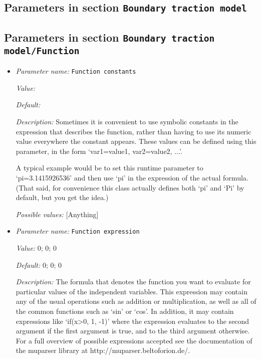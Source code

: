 \subsection{Parameters in section \tt Boundary traction model}
\label{parameters:Boundary_20traction_20model}


\subsection{Parameters in section \tt Boundary traction model/Function}
\label{parameters:Boundary_20traction_20model/Function}

\begin{itemize}
\item {\it Parameter name:} {\tt Function constants}
\label{parameters:Boundary traction model/Function/Function constants}


{\it Value:} 


{\it Default:} 


{\it Description:} Sometimes it is convenient to use symbolic constants in the expression that describes the function, rather than having to use its numeric value everywhere the constant appears. These values can be defined using this parameter, in the form `var1=value1, var2=value2, ...'.

A typical example would be to set this runtime parameter to `pi=3.1415926536' and then use `pi' in the expression of the actual formula. (That said, for convenience this class actually defines both `pi' and `Pi' by default, but you get the idea.)


{\it Possible values:} [Anything]
\item {\it Parameter name:} {\tt Function expression}
\label{parameters:Boundary traction model/Function/Function expression}


{\it Value:} 0; 0; 0


{\it Default:} 0; 0; 0


{\it Description:} The formula that denotes the function you want to evaluate for particular values of the independent variables. This expression may contain any of the usual operations such as addition or multiplication, as well as all of the common functions such as `sin' or `cos'. In addition, it may contain expressions like `if(x>0, 1, -1)' where the expression evaluates to the second argument if the first argument is true, and to the third argument otherwise. For a full overview of possible expressions accepted see the documentation of the muparser library at http://muparser.beltoforion.de/.


\end{itemize}
